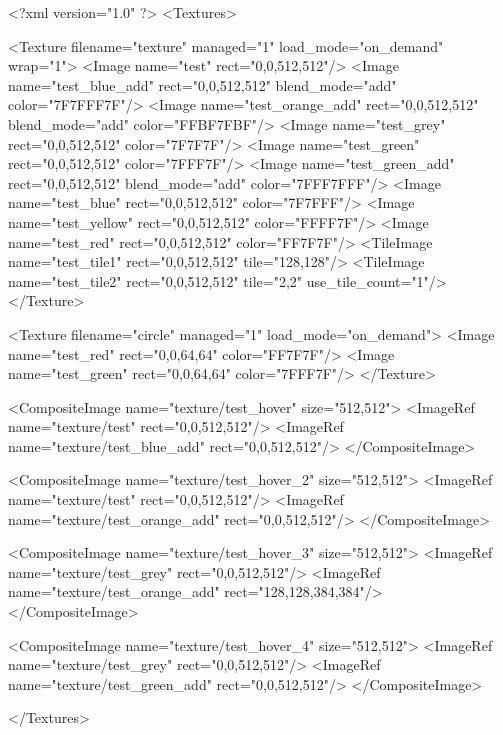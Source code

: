 <?xml version="1.0" ?>
<Textures>

	<Texture filename="texture" managed="1" load_mode="on_demand" wrap="1">
		<Image name="test" rect="0,0,512,512"/>
		<Image name="test_blue_add" rect="0,0,512,512" blend_mode="add" color="7F7FFF7F"/>
		<Image name="test_orange_add" rect="0,0,512,512" blend_mode="add" color="FFBF7FBF"/>
		<Image name="test_grey" rect="0,0,512,512" color="7F7F7F"/>
		<Image name="test_green" rect="0,0,512,512" color="7FFF7F"/>
		<Image name="test_green_add" rect="0,0,512,512" blend_mode="add" color="7FFF7FFF"/>
		<Image name="test_blue" rect="0,0,512,512" color="7F7FFF"/>
		<Image name="test_yellow" rect="0,0,512,512" color="FFFF7F"/>
		<Image name="test_red" rect="0,0,512,512" color="FF7F7F"/>
		<TileImage name="test_tile1" rect="0,0,512,512" tile="128,128"/>
		<TileImage name="test_tile2" rect="0,0,512,512" tile="2,2" use_tile_count="1"/>
	</Texture>
	
	<Texture filename="circle" managed="1" load_mode="on_demand">
		<Image name="test_red" rect="0,0,64,64" color="FF7F7F"/>
		<Image name="test_green" rect="0,0,64,64" color="7FFF7F"/>
	</Texture>
	
	<CompositeImage name="texture/test_hover" size="512,512">
		<ImageRef name="texture/test" rect="0,0,512,512"/>
		<ImageRef name="texture/test_blue_add" rect="0,0,512,512"/>
	</CompositeImage>
	
	<CompositeImage name="texture/test_hover_2" size="512,512">
		<ImageRef name="texture/test" rect="0,0,512,512"/>
		<ImageRef name="texture/test_orange_add" rect="0,0,512,512"/>
	</CompositeImage>
	
	<CompositeImage name="texture/test_hover_3" size="512,512">
		<ImageRef name="texture/test_grey" rect="0,0,512,512"/>
		<ImageRef name="texture/test_orange_add" rect="128,128,384,384"/>
	</CompositeImage>
	
	<CompositeImage name="texture/test_hover_4" size="512,512">
		<ImageRef name="texture/test_grey" rect="0,0,512,512"/>
		<ImageRef name="texture/test_green_add" rect="0,0,512,512"/>
	</CompositeImage>
	
</Textures>
